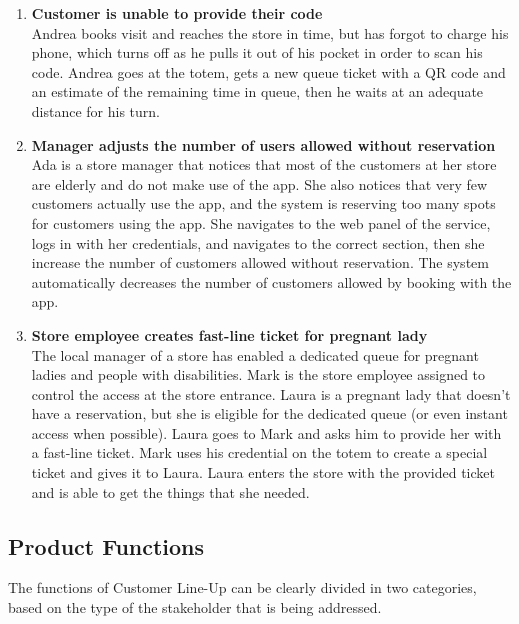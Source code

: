 \begin{enumerate}[label=\Alph*.]
        \item \textbf{Customer is unable to provide their code}\\
            Andrea books visit and reaches the store in time, but has forgot to charge his phone, which turns off as he pulls it out of his pocket in order to scan his code.
            Andrea goes at the totem, gets a new queue ticket with a QR code and an estimate of the remaining time in queue, then he waits at an adequate distance for his turn.
        \item \textbf{Manager adjusts the number of users allowed without reservation}\\
            Ada is a store manager that notices that most of the customers at her store are elderly and do not make use of the app. She also notices that very few
            customers actually use the app, and the system is reserving too many spots for customers using the app. She navigates to the web panel of the service,
            logs in with her credentials, and navigates to the correct section, then she increase the number of customers allowed without reservation. The system
            automatically decreases the number of customers allowed by booking with the app.
        \item \textbf{Store employee creates fast-line ticket for pregnant lady}\\
            The local manager of a store has enabled a dedicated queue for pregnant ladies and people with disabilities.
            Mark is the store employee assigned to control the access at the store entrance. Laura is a pregnant lady that doesn't have a reservation, but she is eligible for the dedicated queue (or even instant access when possible). Laura goes to Mark and asks him to provide her with a fast-line ticket. Mark uses his credential on the totem to create a special ticket and gives it to Laura. Laura enters the store with the provided ticket and is able to get the things that she needed.         
        \end{enumerate}
\subsection{Product Functions}
The functions of Customer Line-Up can be clearly divided in two categories, based on the type of the stakeholder that is being addressed.

